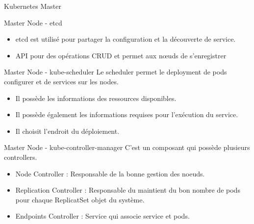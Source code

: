 \documentclass{bredelebeamer}
\begin{document}
\begin{frame}{Kubernetes Master}

\begin{block}{Master Node - etcd}
\begin{itemize}
\item etcd est utilisé pour partager la configuration et la découverte de service.
\item API pour des opérations CRUD et permet aux nœuds de s'enregistrer %
\end{itemize}
\end{block}

\begin{block}{Master Node - kube-scheduler}
Le scheduler permet le deployment de pods configurer et de services sur les nodes.
\begin{itemize}
\item Il possède les informations des ressources disponibles.
\item Il possède également les informations requises pour l'exécution du service.
\item Il choisit l'endroit du déploiement.
\end{itemize}
\end{block}


\begin{block}{Master Node - kube-controller-manager}
C'est un composant qui possède plusieurs controllers.
\begin{itemize}
\item Node Controller : Responsable de la bonne gestion des noeuds.
\item Replication Controller : Responsable du maintient du bon nombre de pods pour chaque ReplicatSet objet du système.
\item Endpoints Controller : Service qui associe service et pods.
\end{itemize}
\end{block}


\end{frame}
\end{document}
